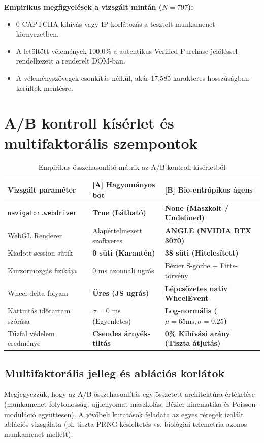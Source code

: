 \documentclass[11pt,a4paper]{article}
\begin{document}
\noindent \textbf{Empirikus megfigyelések a vizsgált mintán ($N=797$):}
\begin{itemize}
    \item 0 CAPTCHA kihívás vagy IP-korlátozás a tesztelt munkamenet-környezetben.
    \item A letöltött vélemények 100.0\%-a autentikus Verified Purchase jelöléssel rendelkezett a renderelt DOM-ban.
    \item A véleményszövegek csonkítás nélkül, akár 17,585 karakteres hosszúságban kerültek mentésre.
\end{itemize}

\section{A/B kontroll kísérlet és multifaktorális szempontok}

\begin{table}[h!]
\centering
\small
\begin{tabular}{p{4.2cm}p{4.2cm}p{4.8cm}}
\toprule
\textbf{Vizsgált paraméter} & \textbf{[A] Hagyományos bot} & \textbf{[B] Bio-entrópikus ágens} \\ \midrule
\texttt{navigator.webdriver} & \textcolor{secondary}{\textbf{True (Látható)}} & \textcolor{primary}{\textbf{None (Maszkolt / Undefined)}} \\
WebGL Renderer & Alapértelmezett szoftveres & \textbf{ANGLE (NVIDIA RTX 3070)} \\
Kiadott session sütik & \textcolor{secondary}{\textbf{0 süti (Karantén)}} & \textcolor{primary}{\textbf{38 süti (Hitelesített)}} \\
Kurzormozgás fizikája & 0 ms azonnali ugrás & Bézier S-görbe + Fitts-törvény \\
Wheel-delta folyam & \textcolor{secondary}{\textbf{Üres (JS ugrás)}} & \textcolor{primary}{\textbf{Lépcsőzetes natív WheelEvent}} \\
Kattintás időtartam szórása & $\sigma = 0\text{ ms}$ (Egyenletes) & \textbf{Log-normális ($\mu=65\text{ms}, \sigma=0.25$)} \\
Tűzfal védelem eredménye & \textbf{Csendes árnyék-tiltás} & \textbf{0\% Kihívási arány (Tiszta átjutás)} \\ \bottomrule
\end{tabular}
\caption{Empirikus összehasonlító mátrix az A/B kontroll kísérletből}
\end{table}

\subsection{Multifaktorális jelleg és ablációs korlátok}
Megjegyezzük, hogy az A/B összehasonlítás egy összetett architektúra értékelése (munkamenet-folytonosság, ujjlenyomat-maszkolás, Bézier-kinematika és Poisson-moduláció együttesen). A jövőbeli kutatások feladata az egyes rétegek izolált ablációs vizsgálata (pl. tiszta PRNG késleltetés vs. biológiai telemetria azonos munkamenet mellett).
\end{document}
